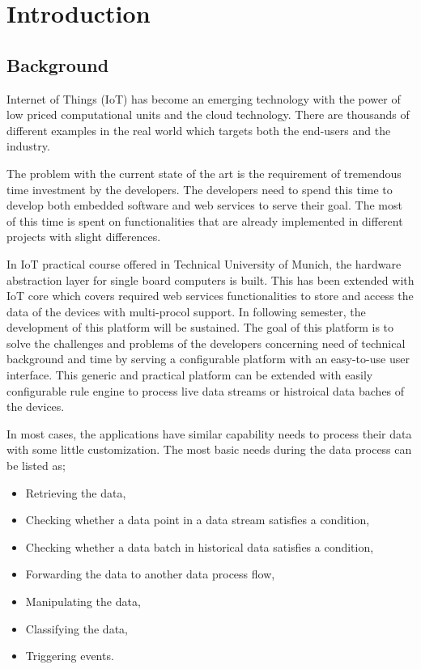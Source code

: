 
\chapter{Introduction}\label{chapter:introduction}

\section{Background}
\label{background}
Internet of Things (IoT) has become an emerging technology with the power of low priced computational units and the cloud technology. There are thousands of different examples in the real world which targets both the end-users and the industry. 

The problem with the current state of the art is the requirement of tremendous time investment by the developers. The developers need to spend this time to develop both embedded software and web services to serve their goal. The most of this time is spent on functionalities that are already implemented in different projects with slight differences.

In IoT practical course offered in Technical University of Munich, the hardware abstraction layer for single board computers is built. This has been extended with IoT core which covers required web services functionalities to store and access the data of the devices with multi-procol support. In following semester, the development of this platform will be sustained. The goal of this platform is to solve the challenges and problems of the developers concerning need of technical background and time by serving a configurable platform with an easy-to-use user interface. This generic and practical platform can be extended with easily configurable rule engine to process live data streams or histroical data baches of the devices.

In most cases, the applications have similar capability needs to process their data with some little customization. The most basic needs during the data process can be listed as;
\begin{itemize}
  \item Retrieving the data,
  \item Checking whether a data point in a data stream satisfies a condition,
  \item Checking whether a data batch in historical data satisfies a condition,
  \item Forwarding the data to another data process flow,
  \item Manipulating the data,
  \item Classifying the data,
  \item Triggering events.
\end{itemize}

